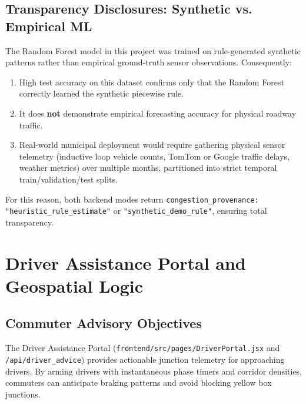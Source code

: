 \documentclass[11pt,a4paper,oneside]{report}
\begin{document}
\section{Transparency Disclosures: Synthetic vs. Empirical ML}
\begin{limitationbox}
The Random Forest model in this project was trained on rule-generated synthetic patterns rather than empirical ground-truth sensor observations. Consequently:
\begin{enumerate}
    \item High test accuracy on this dataset confirms only that the Random Forest correctly learned the synthetic piecewise rule.
    \item It does \textbf{not} demonstrate empirical forecasting accuracy for physical roadway traffic.
    \item Real-world municipal deployment would require gathering physical sensor telemetry (inductive loop vehicle counts, TomTom or Google traffic delays, weather metrics) over multiple months, partitioned into strict temporal train/validation/test splits.
\end{enumerate}
For this reason, both backend modes return \texttt{congestion\_provenance: "heuristic\_rule\_estimate"} or \texttt{"synthetic\_demo\_rule"}, ensuring total transparency.
\end{limitationbox}



\chapter{Driver Assistance Portal and Geospatial Logic}

\section{Commuter Advisory Objectives}
The Driver Assistance Portal (\texttt{frontend/src/pages/DriverPortal.jsx} and \texttt{/api/driver\_advice}) provides actionable junction telemetry for approaching drivers. By arming drivers with instantaneous phase timers and corridor densities, commuters can anticipate braking patterns and avoid blocking yellow box junctions.
\end{document}
